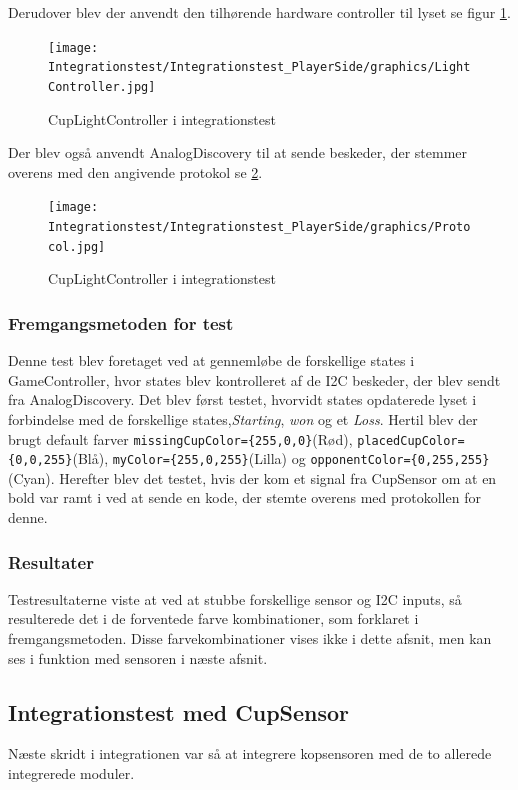 \documentclass[Integrationstest/Integrationstest_main.tex]{subfiles}
\begin{document}
Derudover blev der anvendt den tilhørende hardware controller til lyset se figur \ref{fig:CupLightCtrl_integration}.

\begin{figure}[H]
    \centering
    \texttt{[image: Integrationstest/Integrationstest\_PlayerSide/graphics/LightController.jpg]}
    \caption{CupLightController i integrationstest}
    \label{fig:CupLightCtrl_integration}
\end{figure}

Der blev også anvendt AnalogDiscovery til at sende beskeder, der stemmer overens med den angivende protokol se \ref{fig:Protocol_integration}.
\begin{figure}[H]
    \centering
    \texttt{[image: Integrationstest/Integrationstest\_PlayerSide/graphics/Protocol.jpg]}
    \caption{CupLightController i integrationstest}
    \label{fig:Protocol_integration}
\end{figure}
\subsubsection{Fremgangsmetoden for test}
Denne test blev foretaget ved at gennemløbe de forskellige states i GameController, hvor states blev kontrolleret af de I2C beskeder, der blev sendt fra AnalogDiscovery. Det blev først testet, hvorvidt states opdaterede lyset i forbindelse med de forskellige states,\textit{Starting}, \textit{won} og et \textit{Loss}. Hertil blev der brugt default farver \lstinline|missingCupColor={255,0,0}|(Rød), \lstinline|placedCupColor={0,0,255}|(Blå), \lstinline|myColor={255,0,255}|(Lilla) og \lstinline|opponentColor={0,255,255}|(Cyan). Herefter blev det testet, hvis der kom et signal fra CupSensor om at en bold var ramt i ved at sende en kode, der stemte overens med protokollen for denne. 

\subsubsection{Resultater}
Testresultaterne viste at ved at stubbe forskellige sensor og I2C inputs, så resulterede det i de forventede farve kombinationer, som forklaret i fremgangsmetoden. Disse farvekombinationer vises ikke  i dette afsnit, men kan ses i funktion med sensoren i næste afsnit.

\subsection{Integrationstest med CupSensor}
Næste skridt i integrationen var så at integrere kopsensoren med de to allerede integrerede moduler. 
\end{document}
